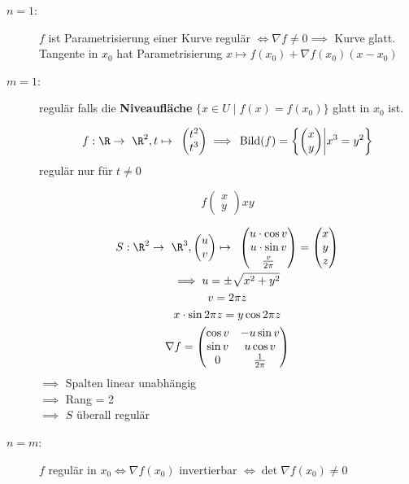 \begin{description}
	\item[$n=1$:] $f$ ist Parametrisierung einer Kurve regulär $\iff \nabla f \neq 0 \implies$ Kurve glatt. Tangente in $x_0$ hat Parametrisierung $x \mapsto f( x_0 ) + \nabla f( x_0 ) ( x-x_0 )$
	\item[$m=1$:] regulär falls die \textbf{Niveaufläche} $\{ x \in U \mid f(x) = f(x_0) \}$ glatt in $x_0$ ist. \\
		\begin{bsp*}
			\[ f: \R \rightarrow \R^2, t \mapsto \begin{pmatrix} t^2 \\ t^3 \end{pmatrix} \implies \Bild(f) = \left\{ \begin{pmatrix} x \\ y \end{pmatrix} \middle|  x^3 = y^2 \right\} \]
			regulär nur für $t \neq 0$
		\end{bsp*}
		\begin{bsp*}
			\[ f\begin{pmatrix} x \\ y \end{pmatrix} xy \]
		\end{bsp*}
		\begin{bsp*}
			\begin{gather*}
				S : \R^2 \rightarrow \R^3 , \begin{pmatrix} u \\ v \end{pmatrix} \mapsto \begin{pmatrix} u \cdot \cos v \\ u \cdot \sin v \\ \frac{v}{2\pi} \end{pmatrix} = \begin{pmatrix} x \\ y \\ z \end{pmatrix} \\
				\implies u = \pm \sqrt{x^2 + y^2} \\
				v = 2\pi z \\
				x \cdot \sin 2\pi z = y \cos 2\pi z \\
				\nabla f = \begin{pmatrix}
					\cos v	& -u \sin v		\\
					\sin v	& u \cos v		\\
					0		& \frac{1}{2\pi}	
				\end{pmatrix}
			\end{gather*}
			$\implies$ Spalten linear unabhängig \\
			$\implies$ Rang = 2 \\
			$\implies$ $S$ überall regulär
		\end{bsp*}
	\item[$n=m$:] $f$ regulär in $x_0 \iff \nabla f(x_0)$ invertierbar $\iff \det \nabla f(x_0) \neq 0$
\end{description}

